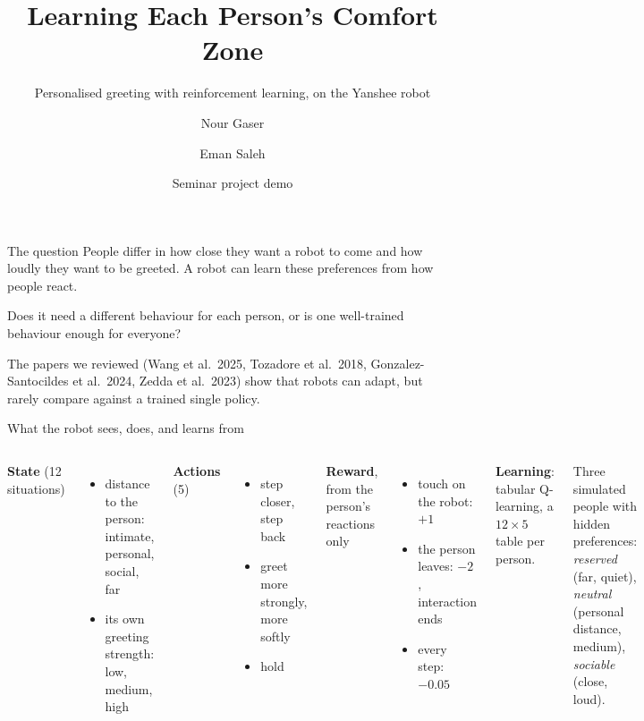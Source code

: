 \documentclass[aspectratio=169,10pt]{beamer}
\title{Learning Each Person's Comfort Zone}
\subtitle{Personalised greeting with reinforcement learning, on the Yanshee robot}
\author{Nour Gaser \and Eman Saleh}
\institute{German International University}
\date{Seminar project demo}
\begin{document}
\maketitle

\begin{frame}{The question}
People differ in how close they want a robot to come and how loudly they want
to be greeted. A robot can learn these preferences from how people react.

\bigskip
\alert{Does it need a different behaviour for each person, or is one
well-trained behaviour enough for everyone?}

\bigskip
The papers we reviewed (Wang et al.\ 2025, Tozadore et al.\ 2018,
Gonzalez-Santocildes et al.\ 2024, Zedda et al.\ 2023) show that robots can
adapt, but rarely compare against a trained single policy.
\end{frame}

\begin{frame}{What the robot sees, does, and learns from}
\begin{columns}[T]
\textbf{State} (12 situations)
\begin{itemize}
  \item distance to the person: intimate, personal, social, far
  \item its own greeting strength: low, medium, high
\end{itemize}
\textbf{Actions} (5)
\begin{itemize}
  \item step closer, step back
  \item greet more strongly, more softly
  \item hold
\end{itemize}
\textbf{Reward}, from the person's reactions only
\begin{itemize}
  \item touch on the robot: $+1$
  \item the person leaves: $-2$, interaction ends
  \item every step: $-0.05$
\end{itemize}
\textbf{Learning}: tabular Q-learning, a $12 \times 5$ table per person.

\medskip
Three simulated people with hidden preferences: \emph{reserved} (far, quiet),
\emph{neutral} (personal distance, medium), \emph{sociable} (close, loud).
\end{columns}
\end{frame}
\end{document}
